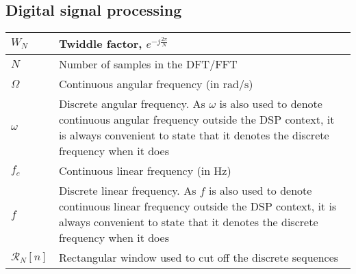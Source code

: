 \subsection{Digital signal processing}
\begin{xltabular}{\textwidth}{XX}
	\(W_N\)                                                                                         & Twiddle factor, \(e^{-j\frac{2\pi}{N}}\) \cite{ingleDigitalSignalProcessing2000}                                                                                                                            \\ \hline
	\(N\)                                                                                           & Number of samples in the DFT/FFT                                                                                                                                                                            \\ \hline
	\(\Omega\) \cite{ingleDigitalSignalProcessing2000}                                              & Continuous angular frequency (in \(\si{\radian\per\second}\))                                                                                                                                               \\ \hline
	\(\omega\)                                                                                      & Discrete angular frequency. As \(\omega\) is also used to denote continuous angular frequency outside the DSP context, it is always convenient to state that it denotes the discrete frequency when it does \\ \hline
	\(f_c\)                                                                                         & Continuous linear frequency (in \(\si{\hertz}\))                                                                                                                                                            \\ \hline
	\(f\)                                                                                           & Discrete linear frequency. As \(f\) is also used to denote continuous linear frequency outside the DSP context, it is always convenient to state that it denotes the discrete frequency when it does        \\ \hline
	\(\mathcal{R}_N [n]\)                                                                           & Rectangular window used to cut off the discrete sequences \cite{ingleDigitalSignalProcessing2000}                                                                                                           \\ \hline

\end{xltabular}
